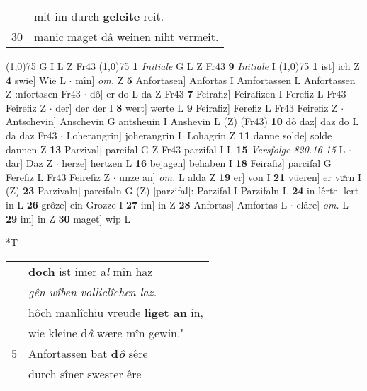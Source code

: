 \documentclass[8pt,a4paper,notitlepage]{article}
\begin{document}
\begin{table}[ht]
\begin{minipage}[t]{0.5\linewidth}
\begin{tabular}{rl}
 & mit im durch \textbf{geleite} reit.\\ 
30 & manic maget dâ weinen niht vermeit.\\ 
\end{tabular}
\scriptsize
\line(1,0){75} \newline
G I L Z Fr43 \newline
\line(1,0){75} \newline
\textbf{1} \textit{Initiale} G L Z Fr43  \textbf{9} \textit{Initiale} I  \newline
\line(1,0){75} \newline
\textbf{1} ist] ich Z \textbf{4} swie] Wie L  $\cdot$ mîn] \textit{om.} Z \textbf{5} Anfortasen] Anfortas I Amfortassen L Anfortassen Z :nfortasen Fr43  $\cdot$ dô] er do L da Z Fr43 \textbf{7} Feirafiz] Feirafizen I Ferefiz L Fr43 Feirefiz Z  $\cdot$ der] der der I \textbf{8} wert] werte L \textbf{9} Feirafiz] Ferefiz L Fr43 Feirefiz Z  $\cdot$ Antschevin] Anschevin G antsheuin I Anshevin L (Z) (Fr43) \textbf{10} dô daz] daz do L da daz Fr43  $\cdot$ Loherangrin] joherangrin L Lohagrin Z \textbf{11} danne solde] solde dannen Z \textbf{13} Parzival] parcifal G Z Fr43 parzifal I L \textbf{15} \textit{Versfolge 820.16-15} L   $\cdot$ dar] Daz Z  $\cdot$ herze] hertzen L \textbf{16} bejagen] behaben I \textbf{18} Feirafiz] parcifal G Ferefiz L Fr43 Feirefiz Z  $\cdot$ unze an] \textit{om.} L alda Z \textbf{19} er] von I \textbf{21} vüeren] er vuͤrn I (Z) \textbf{23} Parzivaln] parcifaln G (Z) [parzifal]: Parzifal  I Parzifaln L \textbf{24} in lêrte] lert in L \textbf{26} grôze] ein Grozze I \textbf{27} im] in Z \textbf{28} Anfortas] Amfortas L  $\cdot$ clâre] \textit{om.} L \textbf{29} im] in Z \textbf{30} maget] wip L \newline
\end{minipage}
\hspace{0.5cm}
\begin{minipage}[t]{0.5\linewidth}
\small
\begin{center}*T
\end{center}
\begin{tabular}{rl}
 & \textbf{doch} ist imer a\textit{l} mîn haz\\ 
 & \textit{gên wîben volliclîchen laz.}\\ 
 & hôch manlîchiu vreude \textbf{liget an} in,\\ 
 & wie kleine d\textit{â} wære mîn gewin."\\ 
5 & Anfortassen bat \textbf{d\textit{ô}} sêre\\ 
 & durch sîner swester êre\\ 

\end{tabular}
\end{minipage}
\end{table}
\end{document}
